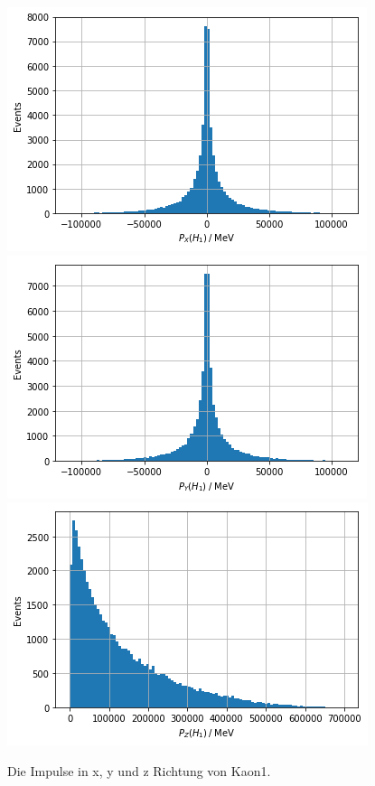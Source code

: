 \begin{figure}[!htb]
  \centering
    \includegraphics[width=\linewidth]{plots/sim_px_kaon1.png}
    \label{fig:px}
  \endminipage\hfill
    \includegraphics[width=\linewidth]{plots/sim_py_kaon1.png}
    \label{fig:py}
  \endminipage\hfill
    \includegraphics[width=\linewidth]{plots/sim_pz_kaon1.png}
    \label{fig:pz}
  \endminipage
  \caption{Die Impulse in x, y und z Richtung von Kaon1.}
  \label{fig:momenta}
\end{figure}

